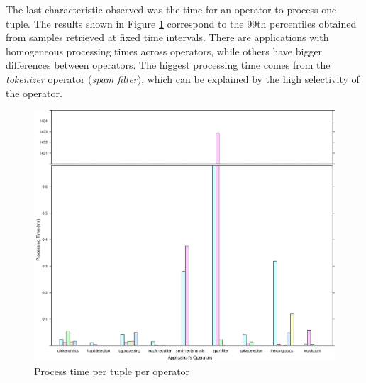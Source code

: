 \documentclass[ppgc,diss,english]{iiufrgs}
\begin{document}
The last characteristic observed was the time for an operator to process one tuple. The results shown in Figure \ref{fig:process_time} correspond to the 99th percentiles obtained from samples retrieved at fixed time intervals. There are applications with homogeneous processing times across operators, while others have bigger differences between operators. The higgest processing time comes from the \emph{tokenizer} operator (\emph{spam filter}), which can be explained by the high selectivity of the operator.

\begin{figure}[ht!]
    \centering
	\includegraphics[width=.8\textwidth]{images/process_time.pdf}
	\caption{Process time per tuple per operator}
	\label{fig:process_time}
\end{figure}
\end{document}
